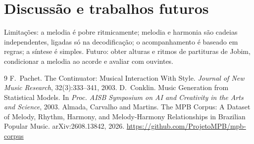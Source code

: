 \documentclass{article}
\begin{document}
\section{Discussão e trabalhos futuros}
Limitações: a melodia é pobre ritmicamente; melodia e harmonia são cadeias independentes, ligadas só na decodificação; o acompanhamento é baseado em regras; a síntese é simples. Futuro: obter alturas e ritmos de partituras de Jobim, condicionar a melodia ao acorde e avaliar com ouvintes.

\begin{thebibliography}{9}
 F.~Pachet. The Continuator: Musical Interaction With Style. \emph{Journal of New Music Research}, 32(3):333--341, 2003.
 D.~Conklin. Music Generation from Statistical Models. In \emph{Proc. AISB Symposium on AI and Creativity in the Arts and Science}, 2003.
 Almada, Carvalho and Martins. The MPB Corpus: A Dataset of Melody, Rhythm, Harmony, and Melody-Harmony Relationships in Brazilian Popular Music. arXiv:2608.13842, 2026. \url{https://github.com/ProjetoMPB/mpb-corpus}
\end{thebibliography}
\end{document}
